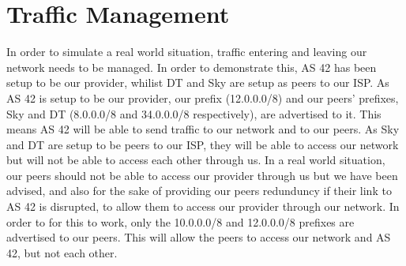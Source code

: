 \section{Traffic Management}
In order to simulate a real world situation, traffic entering and leaving our
network needs to be managed. In order to demonstrate this, AS 42 has been setup
to be our provider, whilist DT and Sky are setup as peers to our ISP. As AS 42
is setup to be our provider, our prefix (12.0.0.0/8) and our peers' prefixes,
Sky and DT (8.0.0.0/8 and 34.0.0.0/8 respectively), are advertised to it. This
means AS 42 will be able to send traffic to our network and to our peers. As
Sky and DT are setup to be peers to our ISP, they will be able to access our
network but will not be able to access each other through us. In a real world
situation, our peers should not be able to access our provider through us but
we have been advised, and also for the sake of providing our peers redunduncy
if their link to AS 42 is disrupted, to allow them to access our provider
through our network. In order to for this to work, only the 10.0.0.0/8 and
12.0.0.0/8 prefixes are advertised to our peers. This will allow the peers to
access our network and AS 42, but not each other.